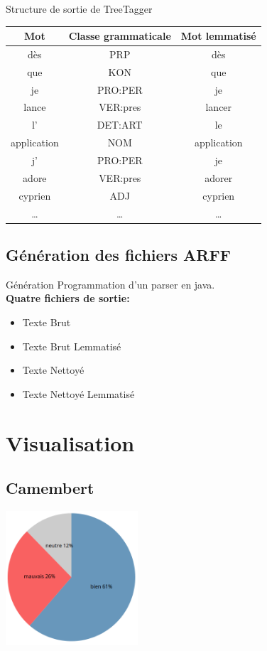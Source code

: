 \documentclass{beamer}
\begin{document}
\begin{frame}
\begin{exampleblock}{Structure de sortie de TreeTagger}
			\centering
			 \begin{tabular}{|c|c|c|}
					\hline
					Mot&Classe grammaticale&Mot lemmatisé\\
					\hline
					dès&PRP&dès\\
					que&KON&que\\
					je&PRO:PER&je\\
					lance&VER:pres&lancer\\
					l'&DET:ART&le\\
					application&NOM&application\\
					j'&PRO:PER&je\\
					adore&VER:pres&adorer\\
					cyprien&ADJ&cyprien\\
					\dots&\dots&\dots\\
					\hline
			 \end{tabular}
	\end{exampleblock}

\end{frame}

\subsection{Génération des fichiers ARFF}
\begin{frame}
	\begin{block}{Génération}
		Programmation d'un parser en java.\\
		
		\textbf{Quatre fichiers de sortie:}
		\begin{itemize}
			\item Texte Brut
			\item Texte Brut Lemmatisé
			\item Texte Nettoyé
			\item Texte Nettoyé Lemmatisé
		\end{itemize}
	\end{block}
\end{frame}

\section{Visualisation}
\subsection{Camembert}
\begin{frame}
	\includegraphics[height=5cm]{imgs/visu1.png}
\end{frame}
\end{document}
